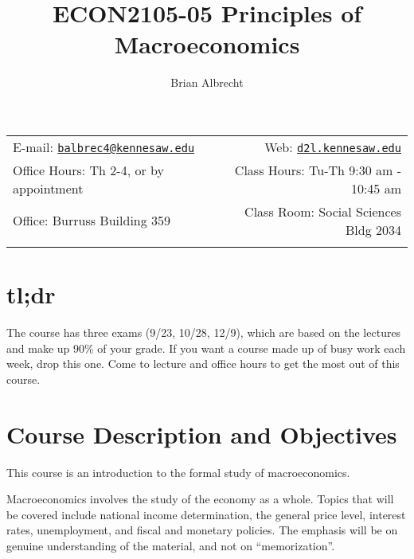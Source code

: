 \documentclass[11pt,]{article}
\title{ECON2105-05 Principles of Macroeconomics}
\author{Brian Albrecht}
\date{}
\begin{document}
  

		\maketitle
		
	
		\thispagestyle{firststyle}



	\noindent \begin{tabular*}{\textwidth}{ @{\extracolsep{\fill}} lr @{\extracolsep{\fill}}}


E-mail: \texttt{\href{mailto:balbrec4@kennesaw.edu}{\nolinkurl{balbrec4@kennesaw.edu}}} & Web: \href{http://d2l.kennesaw.edu}{\tt d2l.kennesaw.edu}\\
Office Hours: Th 2-4, or by appointment  &  Class Hours: Tu-Th 9:30 am - 10:45 am\\
Office: Burruss Building 359  & Class Room: Social Sciences Bldg 2034\\
	&  \\
	\hline
	\end{tabular*}
	
\vspace{2mm}
	


\hypertarget{tldr}{%
\section{tl;dr}\label{tldr}}

The course has three exams (9/23, 10/28, 12/9), which are based on the lectures and make up 90\% of your grade. If you want a course made up of busy work each week, drop this one. Come to lecture and office hours to get the most out of this course.

\hypertarget{course-description-and-objectives}{%
\section*{Course Description and Objectives}\label{course-description-and-objectives}}

This course is an introduction to the formal study of macroeconomics.

Macroeconomics involves the study of the economy as a whole. Topics that will be covered include national
income determination, the general price level, interest rates, unemployment, and fiscal and monetary policies.
The emphasis will be on genuine understanding of the material, and not on ``memorization''.
\end{document}
